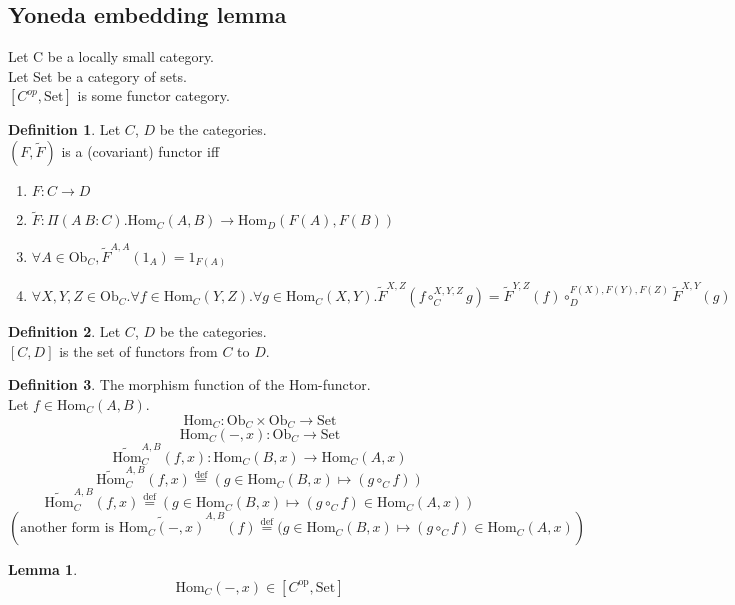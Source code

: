 \documentclass[10pt,a4paper]{article}
\theoremstyle{definition}
\newtheorem{definition}{Definition}[section]
\newtheorem{lemma}{Lemma}[section]
\newcommand{\Ob}{{\mbox{Ob}}}
\newcommand{\Hom}{{\mbox{Hom}}}
\newcommand{\HomMor}{{\widetilde{\Hom}\mbox{}}}
\newcommand{\FMor}{{\widetilde{F}\mbox{}}}
\newcommand{\op}{{\mbox{op}}}
\newcommand{\defi}{{\mbox{def}}}
\newcommand{\eqdef}{{\stackrel{\defi}{=}}}
\newcommand{\Set}{{\mbox{Set}}}
\begin{document}
\subsection{Yoneda embedding lemma}
Let C be a locally small category.\\
Let Set be a category of sets.\\
$[C^{op},\mbox{Set}]$ is some functor category.\\

\begin{definition}
Let $C$, $D$ be the categories.\\
 $(F, \FMor)$ is a (covariant) functor iff\\
\begin{enumerate}
\item $F:C \to D$
\item $\FMor:\Pi(A\ B:C).\Hom_C(A,B) \to \Hom_D(F(A), F(B))$
\item $\forall A\in \Ob_C, \FMor^{A,A}(1_A)=1_{F(A)}$
\item $\forall X,Y,Z \in \Ob_C.\forall f\in\Hom_C(Y,Z).\forall g\in\Hom_C(X,Y). \FMor^{X,Z}(f\circ_C^{X,Y,Z} g)=\FMor^{Y,Z}(f)\circ_D^{F(X),F(Y),F(Z)} \FMor^{X,Y}(g)$
\end{enumerate}

\end{definition}

\begin{definition}
Let $C$, $D$ be the categories.\\
$[C,D]$ is the set of functors from $C$ to $D$.\\
\end{definition}

\begin{definition} The morphism function of the Hom-functor.\\
Let $f\in\Hom_{C}(A,B)$.
$$\Hom_C: \Ob_C \times \Ob_C \to \Set$$
$$\Hom_C(-,x): \Ob_C \to \Set$$
$$\HomMor^{A,B}_C(f,x) : \Hom_C(B,x) \to \Hom_C(A,x)$$
$$\HomMor^{A,B}_C(f,x) \eqdef (g \in\Hom_C(B,x) \mapsto (g \circ_C f))$$
$$\HomMor^{A,B}_C(f,x) \eqdef (g \in\Hom_C(B,x) \mapsto (g \circ_C f) \in\Hom_C(A,x))$$
$$\left(\mbox{another form is }\widetilde{\Hom_C(-,x)}^{A,B}(f) \eqdef (g \in\Hom_C(B,x) \mapsto (g \circ_C f) \in\Hom_C(A,x)\right)$$
\end{definition}

\begin{lemma}
$$\Hom_C(-, x) \in [C^\op,\Set]$$
\end{lemma}
\end{document}
